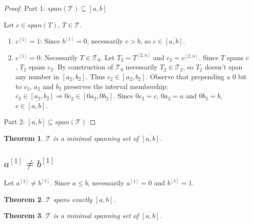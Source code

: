 \documentclass{article}
\theoremstyle{plain}
\newtheorem{theorem}{Theorem}[subsection]
\theoremstyle{definition}
\newcommand{\interval}[2]{[#1, #2]}
\newcommand{\finterval}[2]{\overline{\interval{#1}{#2}}}
\newcommand{\bit}[2]{#1^{[#2]}}
\newcommand{\bits}[3]{#1^{\interval{#2}{#3}}}
\begin{document}
\begin{proof}
Part 1: $span(\mathcal{T}) \subseteq \finterval{a}{b}$

Let $c \in span(T)$, $T \in \mathcal{T}$.

\begin{enumerate}
\item $\bit{c}{1} = 1$: Since $\bit{b}{1} = 0$, necessarily $c > b$, so $c \in \finterval{a}{b}$.
\item $\bit{c}{1} = 0$: Necessarily $T \in \mathcal{T}_0$.
Let $T_2 = \bits{T}{2}{n}$ and $c_2 = \bits{c}{2}{n}$.
Since $T$ spans $c$, $T_2$ spans $c_2$.
By construction of $\mathcal{T}_0$ necessarily $T_2 \in \mathcal{T}_2$,
so $T_2$ doesn't span any number in $\interval{a_2}{b_2}$.
Thus $c_2 \in \finterval{a_2}{b_2}$.
Observe that prepending a $0$ bit to $c_2$, $a_2$ and $b_2$ preserves the interval membership:
$c_2 \in \finterval{a_2}{b_2} \Rightarrow 0 c_2 \in \finterval{0 a_2}{0 b_2}$.
Since $0 c_2 = c$, $0 a_2 = a$ and $0 b_2 = b$,
$c \in \finterval{a}{b}$.
\end{enumerate}

Part 2: $\finterval{a}{b} \subseteq span(\mathcal{T})$
\end{proof}

\begin{theorem}
$\mathcal{T}$ is a minimal spanning set of $\finterval{a}{b}$.
\end{theorem}


\subsection{$\bit{a}{1} \neq \bit{b}{1}$}
Let $\bit{a}{1} \neq \bit{b}{1}$.
Since $a \leq b$, necessarily $\bit{a}{1} = 0$ and $\bit{b}{1} = 1$.


\begin{theorem}
$\mathcal{T}$ spans exactly $\finterval{a}{b}$.
\end{theorem}

\begin{theorem}
$\mathcal{T}$ is a minimal spanning set of $\finterval{a}{b}$.
\end{theorem}




\printglossaries
\end{document}
